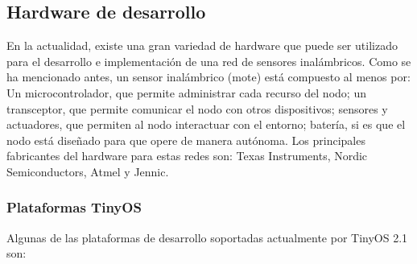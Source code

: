 \subsection{Hardware de desarrollo}
En la actualidad, existe una gran variedad de hardware que puede ser utilizado para el desarrollo e implementación de una red de sensores inalámbricos. Como se ha mencionado antes, un sensor inalámbrico (mote) está compuesto al menos por: Un microcontrolador, que permite administrar cada recurso del nodo; un transceptor, que permite comunicar el nodo con otros dispositivos; sensores y actuadores, que permiten al nodo interactuar con el entorno; batería, si es que el nodo está diseñado para que opere de manera autónoma. Los principales fabricantes del hardware para estas redes son: Texas Instruments, Nordic Semiconductors, Atmel y Jennic.\\

\subsubsection{Plataformas TinyOS}
Algunas de las plataformas de desarrollo soportadas actualmente por TinyOS 2.1 son:

